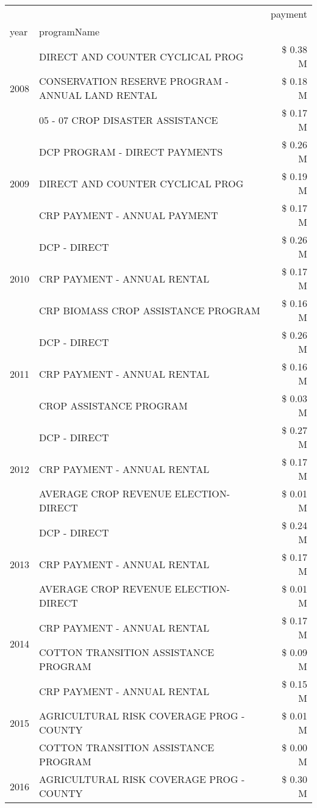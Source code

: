 \begin{tabular}{llr}
\toprule
 &  & payment \\
year & programName &  \\
\midrule
\multirow[t]{3}{*}{2008} & DIRECT AND COUNTER CYCLICAL PROG & \$ 0.38 M \\
 & CONSERVATION RESERVE PROGRAM - ANNUAL LAND RENTAL & \$ 0.18 M \\
 & 05 - 07 CROP DISASTER ASSISTANCE & \$ 0.17 M \\
\cline{1-3}
\multirow[t]{3}{*}{2009} & DCP PROGRAM - DIRECT PAYMENTS & \$ 0.26 M \\
 & DIRECT AND COUNTER CYCLICAL PROG & \$ 0.19 M \\
 & CRP PAYMENT - ANNUAL PAYMENT & \$ 0.17 M \\
\cline{1-3}
\multirow[t]{3}{*}{2010} & DCP - DIRECT & \$ 0.26 M \\
 & CRP PAYMENT - ANNUAL RENTAL & \$ 0.17 M \\
 & CRP BIOMASS CROP ASSISTANCE PROGRAM & \$ 0.16 M \\
\cline{1-3}
\multirow[t]{3}{*}{2011} & DCP - DIRECT & \$ 0.26 M \\
 & CRP PAYMENT - ANNUAL RENTAL & \$ 0.16 M \\
 & CROP ASSISTANCE PROGRAM & \$ 0.03 M \\
\cline{1-3}
\multirow[t]{3}{*}{2012} & DCP - DIRECT & \$ 0.27 M \\
 & CRP PAYMENT - ANNUAL RENTAL & \$ 0.17 M \\
 & AVERAGE CROP REVENUE ELECTION-DIRECT & \$ 0.01 M \\
\cline{1-3}
\multirow[t]{3}{*}{2013} & DCP - DIRECT & \$ 0.24 M \\
 & CRP PAYMENT - ANNUAL RENTAL & \$ 0.17 M \\
 & AVERAGE CROP REVENUE ELECTION-DIRECT & \$ 0.01 M \\
\cline{1-3}
\multirow[t]{2}{*}{2014} & CRP PAYMENT - ANNUAL RENTAL & \$ 0.17 M \\
 & COTTON TRANSITION ASSISTANCE PROGRAM & \$ 0.09 M \\
\cline{1-3}
\multirow[t]{3}{*}{2015} & CRP PAYMENT - ANNUAL RENTAL & \$ 0.15 M \\
 & AGRICULTURAL RISK COVERAGE PROG - COUNTY & \$ 0.01 M \\
 & COTTON TRANSITION ASSISTANCE PROGRAM & \$ 0.00 M \\
\cline{1-3}
\multirow[t]{3}{*}{2016} & AGRICULTURAL RISK COVERAGE PROG - COUNTY & \$ 0.30 M \\

\end{tabular}
